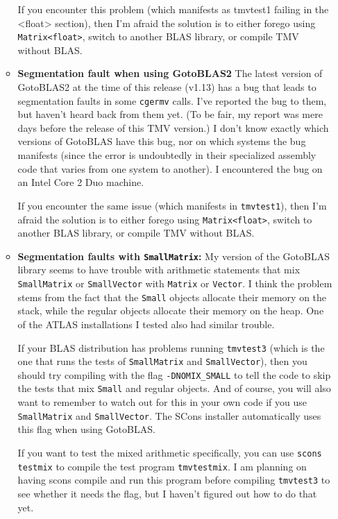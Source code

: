 \documentclass[twoside,letterpaper,11pt]{article}
\renewcommand{\tt}[1]{{\lstinline {#1}}}
\begin{document}
\begin{itemize}
\begin{itemize}
If you encounter this problem (which manifests as tmvtest1 failing in the <float> section),
then I'm afraid the solution is to either forego using \tt{Matrix<float>}, switch to another
BLAS library, or compile TMV without BLAS.

\item {\bf Segmentation fault when using GotoBLAS2}
The latest version of GotoBLAS2 at the time of this release (v1.13) has a bug that leads to segmentation
faults in some \tt{cgermv} calls.  I've reported the bug to them, but haven't heard back from
them yet.  (To be fair, my report was mere days before the release of this TMV version.)  I don't know exactly which versions of GotoBLAS have this bug, nor on which systems the bug manifests (since the error is undoubtedly in their specialized assembly code that varies from one system to another).  I encountered the bug on an Intel Core 2 Duo machine.

If you encounter the same issue (which manifests in \tt{tmvtest1}), then I'm afraid the solution is to either forego using \tt{Matrix<float>}, switch to another BLAS library, or compile TMV without BLAS.

\item {\bf Segmentation faults with \tt{SmallMatrix}:}
My version of the GotoBLAS library seems to have trouble with arithmetic statements that
mix \tt{SmallMatrix} or \tt{SmallVector} with \tt{Matrix} or \tt{Vector}.  I think the
problem stems from the fact that the \tt{Small} objects allocate their memory on the
stack, while the regular objects allocate their memory on the heap.  
One of the ATLAS installations I tested also had similar trouble.

If your BLAS distribution has problems running \texttt{tmvtest3} (which is the one
that runs the tests of 
\tt{SmallMatrix} and \tt{SmallVector}), then you should try
compiling with the flag \texttt{-DNOMIX\_SMALL}
to tell the code to skip the tests that mix \tt{Small} and regular objects.
And of course, you will also want to remember to watch out for this in your own code 
if you use \tt{SmallMatrix} and \tt{SmallVector}.
The SCons installer automatically uses this flag when using GotoBLAS.

If you want to test the mixed arithmetic specifically, you can use \texttt{scons testmix}
to compile the test program \texttt{tmvtestmix}.  I am planning on having scons
compile and run this program before compiling \texttt{tmvtest3} to see whether it needs
the flag, but I haven't figured out how to do that yet.


\end{itemize}
\end{itemize}
\end{document}

